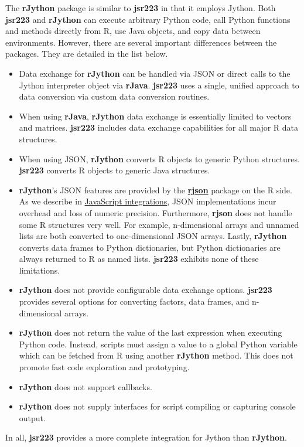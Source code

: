 \documentclass[
article,
11pt, %
a4paper, %
oneside, %
headinclude,footinclude, %
]{scrartcl}
\theoremstyle{definition} %
\theoremstyle{plain} %
\theoremstyle{remark} %
\newcommand{\pkg}[1]{\textbf{#1}}
\newcommand{\CRANpkg}[1]{\href{https://CRAN.R-project.org/package=#1}{\pkg{#1}}}
\begin{document}
The \pkg{rJython} package is similar to \pkg{jsr223} in that it employs Jython. Both \pkg{jsr223} and \pkg{rJython} can execute arbitrary Python code, call Python functions and methods directly from R, use Java objects, and copy data between environments. However, there are several important differences between the packages. They are detailed in the list below.

\begin{itemize}
\item Data exchange for \pkg{rJython} can be handled via JSON or direct calls to the Jython interpreter object via \pkg{rJava}. \pkg{jsr223} uses a single, unified approach to data conversion via custom data conversion routines.

\item When using \pkg{rJava}, \pkg{rJython} data exchange is essentially limited to vectors and matrices. \pkg{jsr223} includes data exchange capabilities for all major R data structures.

\item When using JSON, \pkg{rJython} converts R objects to generic Python structures. \pkg{jsr223} converts R objects to generic Java structures.

\item \pkg{rJython}'s JSON features are provided by the \CRANpkg{rjson} package on the R side. As we describe in \hyperlink{javascript-integrations}{JavaScript integrations}, JSON implementations incur overhead and loss of numeric precision. Furthermore, \pkg{rjson} does not handle some R structures very well. For example, n-dimensional arrays and unnamed lists are both converted to one-dimensional JSON arrays. Lastly, \pkg{rJython} converts data frames to Python dictionaries, but Python dictionaries are always returned to R as named lists. \pkg{jsr223} exhibits none of these limitations.

\item \pkg{rJython} does not provide configurable data exchange options. \pkg{jsr223} provides several options for converting factors, data frames, and n-dimensional arrays.

\item \pkg{rJython} does not return the value of the last expression when executing Python code. Instead, scripts must assign a value to a global Python variable which can be fetched from R using another \pkg{rJython} method. This does not promote fast code exploration and prototyping.

\item \pkg{rJython} does not support callbacks.

\item \pkg{rJython} does not supply interfaces for script compiling or capturing console output.
\end{itemize}
In all, \pkg{jsr223} provides a more complete integration for Jython than \pkg{rJython}.
\end{document}
